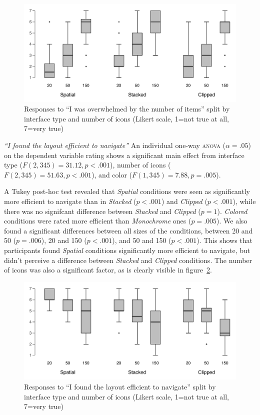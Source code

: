 \documentclass[nobib]{tufte-book} %
\begin{document}
\begin{figure}
\includegraphics{postcon-overwhelmed.pdf}
\caption{Responses to ``I was overwhelmed by the number of items'' split by interface type and number of icons (Likert scale, 1=not true at all, 7=very true)}
\label{fig:overwhelmed}
\end{figure}

\emph{``I found the layout efficient to navigate''}
An individual one-way \textsc{anova} ($\alpha = .05$) on the dependent variable rating shows a significant main effect from interface type ($F(2,345) = 31.12, p < .001$), number of icons ($F(2,345) = 51.63, p < .001$), and color ($F(1,345) = 7.88, p = .005$).

A Tukey post-hoc test revealed that \emph{Spatial} conditions were seen as significantly more efficient to navigate than in \emph{Stacked} ($p < .001$) and \emph{Clipped} ($p < .001$), while there was no signifcant difference between \emph{Stacked} and \emph{Clipped} ($p = 1$). \emph{Colored} conditions were rated more efficient than \emph{Monochrome} ones ($p = .005$). We also found a significant differences between all sizes of the conditions, between 20 and 50 ($p = .006$), 20 and 150 ($p < .001$), and 50 and 150 ($p < .001$). This shows that participants found \emph{Spatial} conditions significantly more efficient to navigate, but didn't perceive a difference between \emph{Stacked} and \emph{Clipped} conditions. The number of icons was also a significant factor, as is clearly visible in figure~\ref{fig:efficient}.

\begin{figure}
\includegraphics{postcon-efficient.pdf}
\caption{Responses to ``I found the layout efficient to navigate'' split by interface type and number of icons (Likert scale, 1=not true at all, 7=very true)}
\label{fig:efficient}
\end{figure}
\end{document}
